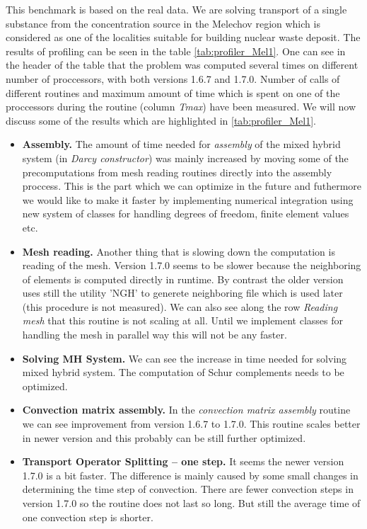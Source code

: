 This benchmark is based on the real data. We are solving transport of a single 
substance from the concentration source in the Melechov region which is considered as
one of the localities suitable for building nuclear waste deposit. The results of profiling can be seen in
the table \ref{tab:profiler_Mel1}. One can see in the header of the table that the problem was computed several times on different 
number of proccessors, with both versions 1.6.7 and 1.7.0. Number of calls of different routines and 
maximum amount of time which is spent on one of the proccessors during the routine (column \emph{Tmax}) have been measured.
We will now discuss some of the results which are highlighted in \ref{tab:profiler_Mel1}.


\begin{itemize}
\item \textbf{Assembly.} The amount of time needed for \emph{assembly} of the mixed hybrid system (in \emph{Darcy constructor}) 
was mainly increased by moving some of the precomputations from mesh reading routines directly into the assembly proccess. 
This is the part which we can optimize in the future and futhermore we would like to make it faster by implementing numerical 
integration using new system of classes for handling degrees of freedom, finite element values etc.

\item \textbf{Mesh reading.} Another thing that is slowing down the computation is reading of the mesh. Version 1.7.0 seems 
to be slower because the neighboring of elements is computed directly in runtime. By contrast the older version uses still 
the utility 'NGH' to generete neighboring file which is used later (this procedure is not measured). We can also see along the 
row \emph{Reading mesh} that this routine is not scaling at all. Until we implement classes for handling the mesh in parallel 
way this will not be any faster.

\item \textbf{Solving MH System.} We can see the increase in time needed for solving mixed hybrid system. The computation 
of Schur complements needs to be optimized.

\item \textbf{Convection matrix assembly.}
In the \emph{convection matrix assembly} routine we can see improvement from version 1.6.7 to 1.7.0. This routine scales better in
newer version and this probably can be still further optimized.

\item \textbf{Transport Operator Splitting -- one step.}
It seems the newer version 1.7.0 is a bit faster. The difference is mainly caused by some small changes in determining the time step of convection. 
There are fewer convection steps in version 1.7.0 so the routine does not last so long. But still the average time of one convection step 
is shorter.


\end{itemize}
